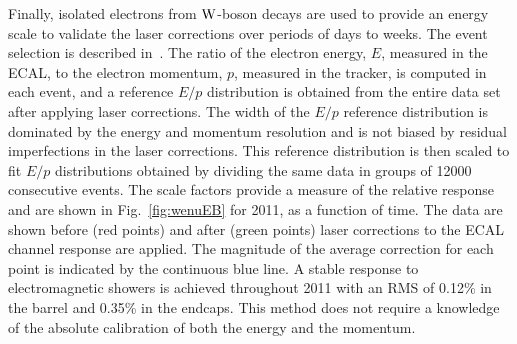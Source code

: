 Finally, isolated electrons from $\mathrm{W}$-boson decays are used to provide an energy
scale to validate the laser corrections over periods of days to
weeks. The event selection is described
in~\cite{EGM-10-004,Khachatryan:2010xn}.
The ratio of the electron energy, $E$, measured in the ECAL, to the
electron momentum, $p$, measured in the tracker, is computed in each
event, and a reference $E/p$ distribution is obtained from the entire
data set after applying laser corrections. The width of the $E/p$
reference distribution is dominated by the energy and momentum
resolution and is not biased by residual imperfections in the laser
corrections. This reference distribution is then scaled to fit
$E/p$ distributions obtained by dividing the same data in groups of
12000 consecutive events. The scale factors provide a measure of the
relative response and are shown in Fig.~\ref{fig:wenuEB} for 2011, as
a function of time. The data are shown before (red points) and after
(green points) laser corrections to the ECAL channel response are
applied. The magnitude of the average correction for each point is
indicated by the continuous blue line. A stable response to
electromagnetic showers is achieved throughout 2011 with an RMS of
0.12\% in the barrel and 0.35\% in the endcaps. This method does not require a
knowledge of the absolute calibration of both the energy and the
momentum.

